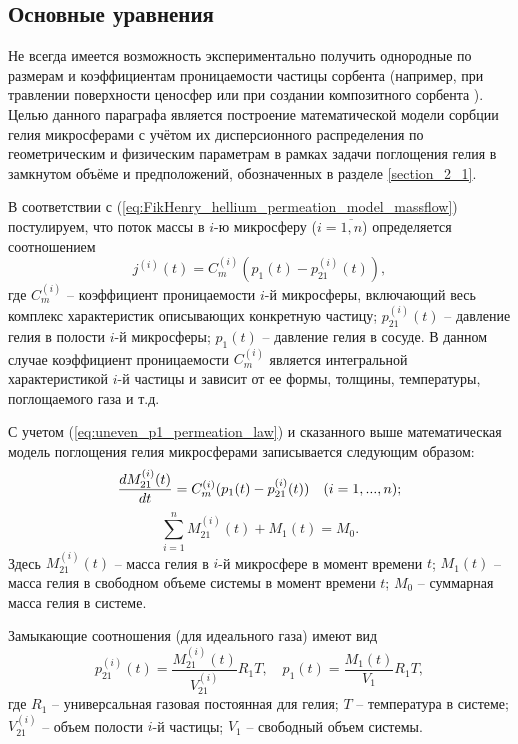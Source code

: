 \subsection{Основные уравнения}
\label{section_2_3_1}

Не всегда имеется возможность экспериментально получить однородные по размерам и коэффициентам проницаемости частицы сорбента  (например, при травлении поверхности ценосфер \cite{ICCT_cenosphere_permeation} или при создании композитного сорбента \cite{Vereshchagin:2016_Vapour_Helium}). Целью данного параграфа является построение математической модели сорбции гелия микросферами с учётом их дисперсионного распределения по геометрическим и физическим параметрам в рамках задачи поглощения гелия в замкнутом объёме и предположений, обозначенных в разделе \ref{section_2_1}.

В соответствии с (\ref{eq:FikHenry_hellium_permeation_model_massflow}) постулируем, что поток массы в $i$-ю микросферу ($i=\overline{1,n}$) определяется соотношением
\begin{equation}
\label{eq:uneven_p1_permeation_law}	
j^{(i)}(t) = C_m^{(i)}(p_1(t)-p_{21}^{(i)}(t)),
\end{equation}
где $C_m^{(i)}$	-- коэффициент проницаемости $i$-й микросферы, включающий весь комплекс характеристик описывающих конкретную частицу;
$p_{21}^{(i)}(t)$ -- давление гелия в полости $i$-й микросферы;
$p_1(t)$ -- давление гелия в сосуде. В данном случае коэффициент проницаемости $C_m^{(i)}$ является интегральной характеристикой $i$-й частицы и зависит от ее формы, толщины, температуры, поглощаемого газа и т.д.

С учетом (\ref{eq:uneven_p1_permeation_law}) и  сказанного выше  математическая модель поглощения гелия микросферами записывается следующим образом:	
\begin{equation}
\label{eq:M21i_relations}
\frac{dM_{21}^{(i)}(t)}{dt}  =  C_m^{(i)}(p_1(t)-p_{21}^{(i)}(t)) \quad (i=1,...,n);
\end{equation}
\begin{equation}
\label{eq:uneven_conserv_law}
\sum\limits_{i=1}^n M_{21}^{(i)}(t)+M_1(t)   =   M_0.
\end{equation}
Здесь $M_{21}^{(i)}(t)$ -- масса гелия в $i$-й микросфере в момент времени $t$; $M_1(t)$ -- масса гелия в свободном объеме системы в момент времени $t$; $M_0$ -- суммарная масса гелия в системе.

Замыкающие соотношения (для идеального газа) имеют вид
\begin{equation}
\label{eq:uneven_closing_relations}
p_{21}^{(i)}(t) =\frac{M_{21}^{(i)}(t)}{V_{21}^{(i)}} R_1 T, \quad p_{1}(t) =\frac{M_{1}(t)}{V_{1}} R_1 T,
\end{equation}	
где $R_1$ -- универсальная газовая постоянная для гелия; $T$ -- температура в системе; $V_{21}^{(i)}$ -- объем полости $i$-й частицы; $V_1$ -- свободный объем системы.

